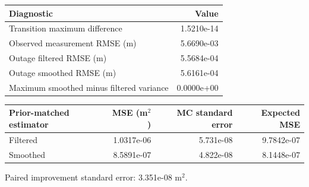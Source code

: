 \begin{center}\small
\begin{tabular}{lr}\toprule
Diagnostic & Value\\\midrule
Transition maximum difference & 1.5210e-14\\
Observed measurement RMSE (m) & 5.6690e-03\\
Outage filtered RMSE (m) & 5.5684e-04\\
Outage smoothed RMSE (m) & 5.6161e-04\\
Maximum smoothed minus filtered variance & 0.0000e+00\\
\bottomrule\end{tabular}
\par\medskip
\begin{tabular}{lrrr}\toprule
Prior-matched estimator & MSE (m$^2$) & MC standard error & Expected MSE\\\midrule
Filtered & 1.0317e-06 & 5.731e-08 & 9.7842e-07\\
Smoothed & 8.5891e-07 & 4.822e-08 & 8.1448e-07\\
\bottomrule\end{tabular}
\par Paired improvement standard error: 3.351e-08 m$^2$.
\end{center}
